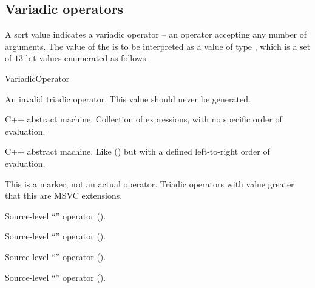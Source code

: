 \subsection{Variadic operators}
\label{sec:ifc:OperatorSort:Variadic}

A sort value  indicates a variadic operator -- 
an operator accepting any number of arguments.  The
value of the  is to be interpreted as a value of type 
, which is a set of $13$-bit values enumerated as follows.
%
\begin{Enumeration}{VariadicOperator}

	\setcounter{enumi}{1023}
\end{Enumeration}


An invalid triadic operator.  This value should never be generated.


C++ abstract machine.  Collection of expressions, with no specific order of evaluation. 


C++ abstract machine.  Like  
() but with a defined left-to-right 
order of evaluation.

This is a marker, not an actual operator. Triadic operators with 
value greater that this are MSVC extensions.

Source-level ``'' operator ().

Source-level ``'' operator ().

Source-level ``'' operator ().

Source-level ``'' operator 
().























